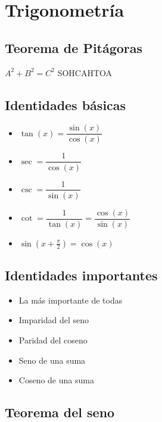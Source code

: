 \section{Trigonometría}

\subsection*{Teorema de Pitágoras}

\hfil
$A^2 + B^2 = C^2$
\hfil
SOHCAHTOA
\hfil


\subsection*{Identidades básicas}

\begin{itemize}
\item $\tan(x) = \dfrac{\sin(x)}{\cos(x)}$
\item $\sec = \dfrac{1}{\cos(x)}$
\item $\csc = \dfrac{1}{\sin(x)}$
\item $\cot = \dfrac{1}{\tan(x)} = \dfrac{\cos(x)}{\sin(x)}$
\item $\sin\left(x + \frac{\pi}{2}\right) = \cos(x)$
\end{itemize}


\subsection*{Identidades importantes}

\begin{itemize}
    \item {} La más importante de todas

    \item {} Imparidad del seno

    \item {} Paridad del coseno

    \item {} Seno de una suma
    
    \item {} Coseno de una suma
\end{itemize}


\subsection*{Teorema del seno}

